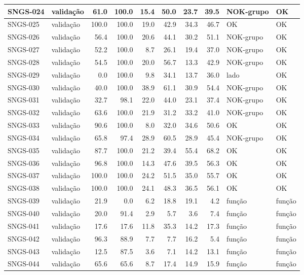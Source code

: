 \begin{small}
\begin{longtable}{|l|l|r|r|r|r|r|r|l|l|}
SNGS-024 & validação & 61.0 & 100.0 & 15.4 & 50.0 & 23.7 & 39.5 & NOK-grupo & OK \\ \hline
SNGS-025 & validação & 100.0 & 100.0 & 19.0 & 42.9 & 34.3 & 46.7 & OK & OK \\ \hline
SNGS-026 & validação & 56.4 & 100.0 & 20.6 & 44.1 & 30.2 & 51.1 & NOK-grupo & OK \\ \hline
SNGS-027 & validação & 52.2 & 100.0 & 8.7 & 26.1 & 19.4 & 37.0 & NOK-grupo & OK \\ \hline
SNGS-028 & validação & 54.5 & 100.0 & 20.0 & 56.7 & 13.3 & 42.9 & NOK-grupo & OK \\ \hline
SNGS-029 & validação & 0.0 & 100.0 & 9.8 & 34.1 & 13.7 & 36.0 & lado & OK \\ \hline
SNGS-030 & validação & 40.0 & 100.0 & 38.9 & 61.1 & 30.9 & 54.4 & NOK-grupo & OK \\ \hline
SNGS-031 & validação & 32.7 & 98.1 & 22.0 & 44.0 & 23.1 & 37.4 & NOK-grupo & OK \\ \hline
SNGS-032 & validação & 63.6 & 100.0 & 21.9 & 31.2 & 33.2 & 41.0 & NOK-grupo & OK \\ \hline
SNGS-033 & validação & 90.6 & 100.0 & 8.0 & 32.0 & 34.6 & 50.6 & OK & OK \\ \hline
SNGS-034 & validação & 65.8 & 97.4 & 28.9 & 60.5 & 28.9 & 45.4 & NOK-grupo & OK \\ \hline
SNGS-035 & validação & 87.7 & 100.0 & 21.2 & 39.4 & 55.4 & 68.2 & OK & OK \\ \hline
SNGS-036 & validação & 96.8 & 100.0 & 14.3 & 47.6 & 39.5 & 56.3 & OK & OK \\ \hline
SNGS-037 & validação & 100.0 & 100.0 & 24.2 & 51.5 & 35.0 & 55.7 & OK & OK \\ \hline
SNGS-038 & validação & 100.0 & 100.0 & 24.1 & 48.3 & 36.5 & 56.1 & OK & OK \\ \hline
SNGS-039 & validação & 21.9 & 0.0 & 6.2 & 18.8 & 19.1 & 4.2 & função & função \\ \hline
SNGS-040 & validação & 20.0 & 91.4 & 2.9 & 5.7 & 3.6 & 7.4 & função & função \\ \hline
SNGS-041 & validação & 17.6 & 17.6 & 11.8 & 35.3 & 14.2 & 17.3 & função & função \\ \hline
SNGS-042 & validação & 96.3 & 88.9 & 7.7 & 7.7 & 16.2 & 5.4 & função & função \\ \hline
SNGS-043 & validação & 12.5 & 87.5 & 3.6 & 7.1 & 14.2 & 13.1 & função & função \\ \hline
SNGS-044 & validação & 65.6 & 65.6 & 8.7 & 17.4 & 14.9 & 15.9 & função & função \\ \hline

\end{longtable}
\end{small}
